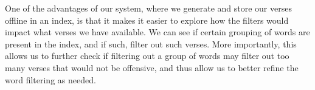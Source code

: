\documentclass[11pt]{article}
\begin{document}
One of the advantages of our system, where we generate and store our verses offline in an index, is that it makes it easier to explore how the filters would impact what verses we have available.
We can see if certain grouping of words are present in the index, and if such, filter out such verses.
More importantly, this allows us to further check if filtering out a group of words may filter out too many verses that would not be offensive, and thus allow us to better refine the word filtering as needed.










\end{document}
